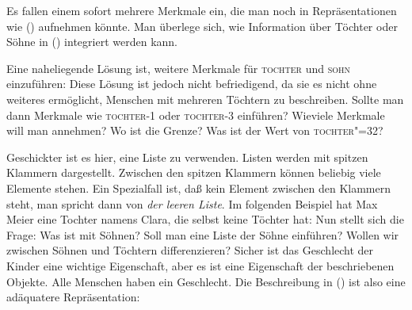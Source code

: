 Es fallen einem sofort mehrere Merkmale ein, die man noch in Repräsentationen wie ()
aufnehmen könnte. Man überlege sich, wie Information über Töchter oder Söhne in 
() integriert werden kann.

Eine naheliegende Lösung ist, weitere Merkmale für \textsc{tochter} und \textsc{sohn}
einzuführen:
\ea
{}
\z
Diese Lösung ist jedoch nicht befriedigend, da sie es nicht ohne weiteres
ermöglicht, Menschen mit mehreren Töchtern zu beschreiben. Sollte man dann
Merkmale wie \textsc{tochter-1} oder \textsc{tochter-3} einführen?
\ea
{}
\z
Wieviele Merkmale will man annehmen? Wo ist die Grenze?
Was ist der Wert von \textsc{tochter"=32}?

Geschickter ist es hier, eine Liste zu verwenden. Listen werden mit spitzen
Klammern dargestellt. Zwischen den spitzen Klammern können beliebig
viele Elemente stehen. Ein Spezialfall ist, daß kein Element zwischen den
Klammern steht, man spricht dann von \emph{der leeren Liste}. Im folgenden Beispiel
hat Max Meier eine Tochter namens Clara, die selbst keine Töchter hat:
\ea
{}
\z
Nun stellt sich die Frage: Was ist mit Söhnen? Soll man eine Liste der Söhne einführen?
Wollen wir zwischen Söhnen und Töchtern differenzieren? 
Sicher ist das Geschlecht der Kinder eine wichtige Eigenschaft, aber es ist eine Eigenschaft
der beschriebenen Objekte. Alle Menschen haben ein Geschlecht. Die Beschreibung in ()
ist also eine adäquatere Repräsentation:

